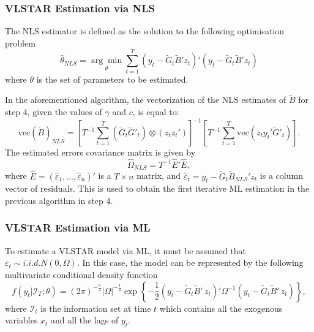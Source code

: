 \subsubsection{VLSTAR Estimation via NLS}
The NLS estimator is defined as the solution to the following optimisation problem
\begin{equation}\label{eq:minQT}
\hat{\theta}_{NLS} = \underset{\theta}{\arg\min}\sum_{t=1}^{T}\left(y_t-\tilde{G}_t\tilde{B}'z_t\right)'\left(y_t-\tilde{G}_t\tilde{B}'z_t\right)
\end{equation}
where $\theta$ is the set of parameters to be estimated.

In the aforementioned algorithm, the vectorization of the NLS estimates of $\tilde{B}$ for step 4, given the values of $\gamma$ and $c$, is equal to:
\begin{equation}\label{eq:NLS}
\text{vec}(\tilde{B})_{NLS} = \left[T^{-1}\sum_{t=1}^{T}\left(\tilde{G}_t \tilde{G}'_t\right)\otimes \left(z_t z_t'\right)\right]^{-1} \left[T^{-1}\sum_{t=1}^{T}\text{vec}\left(z_t y_t' \tilde{G}'_t\right)\right].
\end{equation}
The estimated errors covariance matrix is given by
\begin{equation}\label{eq:Omega}
\hat{\Omega}_{NLS} = T^{-1}\hat{E}'\hat{E},
\end{equation}
where $\hat{E} = \left(\hat{\varepsilon}_1, \ldots, \hat{\varepsilon}_n\right)'$ is a $T \times n$ matrix, and $\hat{\varepsilon}_t = y_t - \tilde{G}_t\tilde{B}_{NLS}'z_t$ is a column vector of residuals. This is used to obtain the first iterative ML estimation in the previous algorithm in step 4.


\subsubsection{VLSTAR Estimation via ML}
To estimate a VLSTAR model via ML, it must be assumed that $\varepsilon_t\sim i.i.d.N(0,\Omega)$. In this case, the model can be represented by the following multivariate conditional density function
\begin{equation}\label{eq:ML}
f\left(y_t|\mathcal{I}_T;\theta\right)=\left(2\pi\right)^{-\frac{n}{2}}|\Omega|^{-\frac{1}{2}}\exp\left\{-\frac{1}{2}\left(y_t-\tilde{G}_t\tilde{B}'\,z_t\right)'\Omega^{-1}\left(y_t-\tilde{G}_t\tilde{B}'\,z_t\right)\right\},
\end{equation}
where $\mathcal{I}_t$ is the information set at time $t$ which contains all the exogenous variables $x_t$ and all the lags of $y_t$. 


